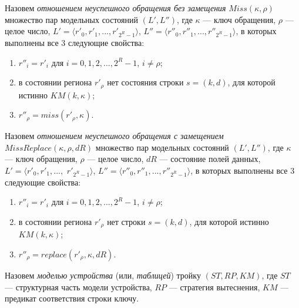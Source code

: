Назовем \emph{отношением неуспешного обращения без замещения} $Miss(\kappa, \rho)$ множество пар модельных состояний $(L', L'')$, где $\kappa$ --- ключ обращения, $\rho$ --- целое число, $L' = \langle r'_0, r'_1, ..., r'_{2^R-1} \rangle$, $L'' = \langle r''_0, r''_1, ..., r''_{2^R-1} \rangle$, в которых выполнены все 3 следующие свойства:
  \begin{enumerate}
    \item $r''_i = r'_i$ для $i = 0, 1, 2, ..., 2^R{-}1$, $i \neq \rho$;
    \item в состоянии региона $r'_{\rho}$ нет состояния строки $s = (k,d)$, для которой истинно $KM(k, \kappa)$;
    \item $r''_{\rho} = miss(r'_{\rho}, \kappa)$.
  \end{enumerate}

Назовем \emph{отношением неуспешного обращения с замещением}\\ $MissReplace(\kappa, \rho, dR)$ множество пар модельных состояний $(L', L'')$, где $\kappa$ --- ключ обращения, $\rho$ --- целое число, $dR$ --- состояние полей данных, $L' = \langle r'_0, r'_1, ...,$ $r'_{2^R-1} \rangle$, $L'' = \langle r''_0, r''_1, ..., r''_{2^R-1} \rangle$, в которых выполнены все 3 следующие свойства:
  \begin{enumerate}
    \item $r''_i = r'_i$ для $i = 0, 1, 2, ..., 2^R{-}1$, $i \neq \rho$;
    \item в состоянии региона $r'_{\rho}$ нет строки $s = (k,d)$, для которой истинно $KM(k, \kappa)$;
    \item $r''_{\rho} = replace(r'_{\rho}, \kappa, dR)$.
  \end{enumerate}


Назовем \emph{моделью устройства} (или, \emph{таблицей}) тройку $(ST, RP, KM)$, где $ST$ --- структурная часть модели устройства, $RP$ --- стратегия вытеснения, $KM$ --- предикат соответствия строки ключу.


